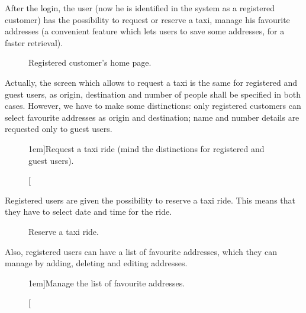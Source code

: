 After the login, the user (now he is identified in the system as a registered customer) has the possibility to request or reserve a taxi, manage his favourite addresses (a convenient feature which lets users to save some addresses, for a faster retrieval).

\begin{figure}%
	\hfill%
	\hfill%
	\caption{Registered customer's home page.}\label{fig:logged}
\end{figure}

\newpage

Actually, the screen which allows to request a taxi is the same for registered and guest users, as origin, destination and number of people shall be specified in both cases. However, we have to make some distinctions: only registered customers can select favourite addresses as origin and destination; name and number details are requested only to guest users. 

\begin{figure}%
	\hfill%
	\hfill%
	\hfill%
	\caption[][1em]{Request a taxi ride (mind the distinctions for registered and guest users).}\label{fig:request}
\end{figure}

Registered users are given the possibility to reserve a taxi ride. This means that they have to select date and time for the ride. 

\begin{figure}%
	\hfill%
	\hfill%
	\caption{Reserve a taxi ride.}\label{fig:reservation}
\end{figure}

\newpage

Also, registered users can have a list of favourite addresses, which they can manage by adding, deleting and editing addresses.

\begin{figure}%
	\hfill%
	\hfill%
	\hfill%
	\caption[][1em]{Manage the list of favourite addresses.}\label{fig:manageAddresses}
\end{figure}

